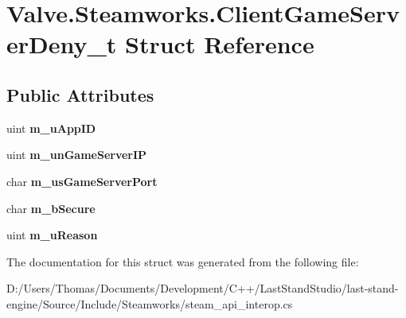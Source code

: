 \hypertarget{structValve_1_1Steamworks_1_1ClientGameServerDeny__t}{}\section{Valve.\+Steamworks.\+Client\+Game\+Server\+Deny\+\_\+t Struct Reference}
\label{structValve_1_1Steamworks_1_1ClientGameServerDeny__t}
\subsection*{Public Attributes}
\begin{DoxyCompactItemize}
\item 
\hypertarget{structValve_1_1Steamworks_1_1ClientGameServerDeny__t_a225a979afb6b3c5de243220fd6c79eac}{}uint {\bfseries m\+\_\+u\+App\+I\+D}\label{structValve_1_1Steamworks_1_1ClientGameServerDeny__t_a225a979afb6b3c5de243220fd6c79eac}

\item 
\hypertarget{structValve_1_1Steamworks_1_1ClientGameServerDeny__t_a16353b0d7eeaddeb522d09170520b92d}{}uint {\bfseries m\+\_\+un\+Game\+Server\+I\+P}\label{structValve_1_1Steamworks_1_1ClientGameServerDeny__t_a16353b0d7eeaddeb522d09170520b92d}

\item 
\hypertarget{structValve_1_1Steamworks_1_1ClientGameServerDeny__t_a243832bb2fead080dc1ffc896301dde8}{}char {\bfseries m\+\_\+us\+Game\+Server\+Port}\label{structValve_1_1Steamworks_1_1ClientGameServerDeny__t_a243832bb2fead080dc1ffc896301dde8}

\item 
\hypertarget{structValve_1_1Steamworks_1_1ClientGameServerDeny__t_a861e0d9b642c9d39e13b453a9d63c3ca}{}char {\bfseries m\+\_\+b\+Secure}\label{structValve_1_1Steamworks_1_1ClientGameServerDeny__t_a861e0d9b642c9d39e13b453a9d63c3ca}

\item 
\hypertarget{structValve_1_1Steamworks_1_1ClientGameServerDeny__t_aa51ec371f8c0600c572063cc5dc523cc}{}uint {\bfseries m\+\_\+u\+Reason}\label{structValve_1_1Steamworks_1_1ClientGameServerDeny__t_aa51ec371f8c0600c572063cc5dc523cc}

\end{DoxyCompactItemize}


The documentation for this struct was generated from the following file\+:\begin{DoxyCompactItemize}
\item 
D\+:/\+Users/\+Thomas/\+Documents/\+Development/\+C++/\+Last\+Stand\+Studio/last-\/stand-\/engine/\+Source/\+Include/\+Steamworks/steam\+\_\+api\+\_\+interop.\+cs\end{DoxyCompactItemize}
